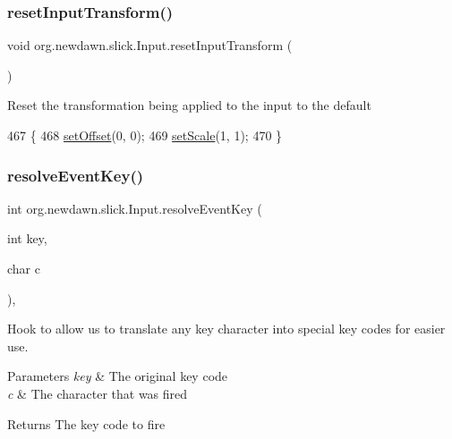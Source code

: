 \subsubsection{\texorpdfstring{reset\+Input\+Transform()}{resetInputTransform()}}
{\footnotesize\ttfamily void org.\+newdawn.\+slick.\+Input.\+reset\+Input\+Transform (\begin{DoxyParamCaption}{ }\end{DoxyParamCaption})\hspace{0.3cm}{\ttfamily [inline]}}

Reset the transformation being applied to the input to the default 
\begin{DoxyCode}
467                                       \{
468         \mbox{\hyperlink{classorg_1_1newdawn_1_1slick_1_1_input_af618e44ab698b596f7b56e6bda4457eb}{setOffset}}(0, 0);
469         \mbox{\hyperlink{classorg_1_1newdawn_1_1slick_1_1_input_a123f4ac6d8666b016ce0e8425b998357}{setScale}}(1, 1);
470     \}
\end{DoxyCode}
\mbox{\label{classorg_1_1newdawn_1_1slick_1_1_input_aa1d5dedd4c21f0031aaf52796fa75237}} 
\subsubsection{\texorpdfstring{resolve\+Event\+Key()}{resolveEventKey()}}
{\footnotesize\ttfamily int org.\+newdawn.\+slick.\+Input.\+resolve\+Event\+Key (\begin{DoxyParamCaption}\item[{int}]{key,  }\item[{char}]{c }\end{DoxyParamCaption})\hspace{0.3cm}{\ttfamily [inline]}, {\ttfamily [private]}}

Hook to allow us to translate any key character into special key codes for easier use.


\begin{DoxyParams}{Parameters}
{\em key} & The original key code \\
\hline
{\em c} & The character that was fired \\
\hline
\end{DoxyParams}
\begin{DoxyReturn}{Returns}
The key code to fire 
\end{DoxyReturn}


